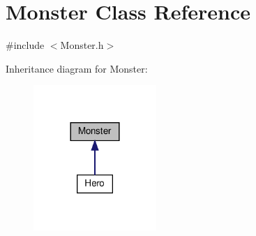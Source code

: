 \hypertarget{classMonster}{}\section{Monster Class Reference}
\label{classMonster}


{\ttfamily \#include $<$Monster.\+h$>$}



Inheritance diagram for Monster\+:
\nopagebreak
\begin{figure}[H]
\begin{center}
\leavevmode
\includegraphics[width=132pt]{classMonster__inherit__graph}
\end{center}
\end{figure}
